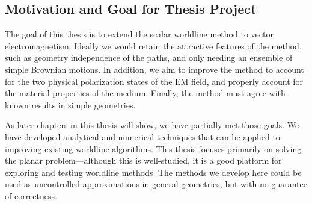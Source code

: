 \subsection{Motivation and Goal for Thesis Project}

The goal of this thesis is to extend the scalar worldline method to vector electromagnetism.
Ideally we would retain the attractive features of the method, such as geometry independence of the paths,
and only needing an ensemble of simple Brownian motions.
In addition, we aim to improve the method to account for the two physical polarization
states of the EM field, and properly account for the material properties of the medium.  
Finally, the method must agree with known results in simple geometries.  

As later chapters in this thesis will show, we have partially met those goals.  We have developed analytical
and numerical techniques that can be applied to improving existing worldline algorithms.
This thesis focuses primarily on solving the planar problem---although this is well-studied,
it is a good platform for exploring and testing worldline methods.  
The methods we develop here could be used as uncontrolled approximations in general geometries, but with
no guarantee of correctness.  

